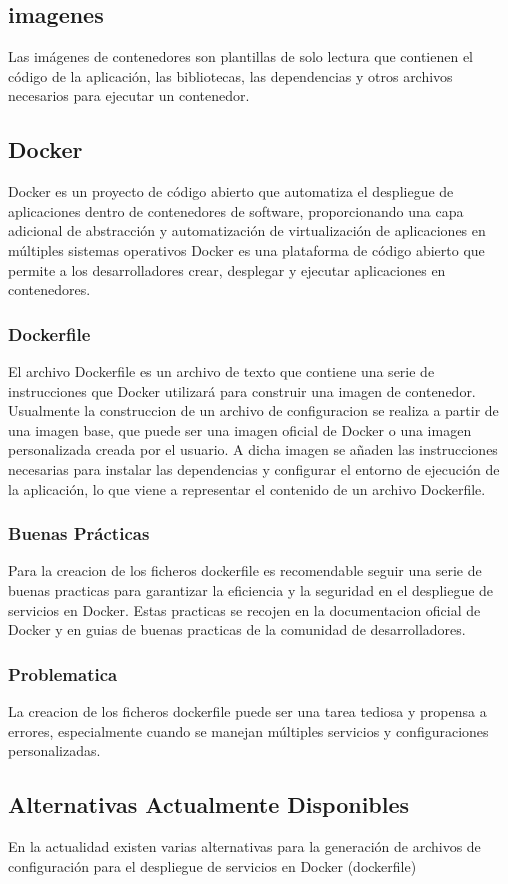 \documentclass[12pt, a4paper, twoside]{article}
\begin{document}
\subsection{imagenes}
Las imágenes de contenedores son plantillas de solo lectura que contienen el código de la aplicación, las bibliotecas, las dependencias y otros archivos necesarios para ejecutar un contenedor.
\subsection{Docker}
Docker es un proyecto de código abierto que automatiza el despliegue de aplicaciones dentro de contenedores de software, proporcionando una capa adicional de abstracción y automatización de virtualización de aplicaciones en múltiples sistemas operativos
Docker es una plataforma de código abierto que permite a los desarrolladores crear, desplegar y ejecutar aplicaciones en contenedores. 
\subsubsection{Dockerfile}
El archivo Dockerfile es un archivo de texto que contiene una serie de instrucciones que Docker utilizará para construir una imagen de contenedor.
Usualmente la construccion de un archivo de configuracion se realiza a partir de una imagen base, que puede ser una imagen oficial de Docker o una imagen personalizada creada por el usuario.
A dicha imagen se añaden las instrucciones necesarias para instalar las dependencias y configurar el entorno de ejecución de la aplicación, lo que viene a representar el contenido de un archivo Dockerfile.
\subsubsection{Buenas Prácticas}
Para la creacion de los ficheros dockerfile es recomendable seguir una serie de buenas practicas para garantizar la eficiencia y la seguridad en el despliegue de servicios en Docker.
Estas practicas se recojen en la documentacion oficial de Docker y en guias de buenas practicas de la comunidad de desarrolladores.
\subsubsection{Problematica}
La creacion de los ficheros dockerfile puede ser una tarea tediosa y propensa a errores, especialmente cuando se manejan múltiples servicios y configuraciones personalizadas.
\subsection{Alternativas Actualmente Disponibles}
En la actualidad existen varias alternativas para la generación de archivos de configuración para el despliegue de servicios en Docker (dockerfile)
\end{document}
